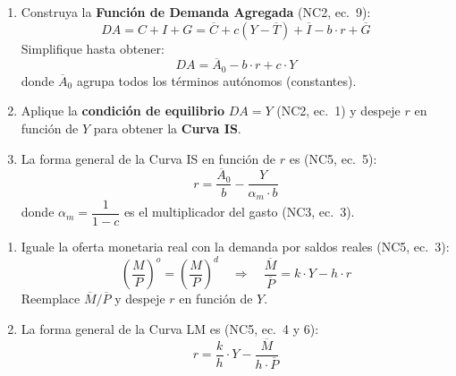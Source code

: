 \documentclass[11pt,a4paper]{article}
\newcommand{\barvar}[1]{\overline{#1}}
\begin{document}
\begin{hintbox}
\begin{enumerate}[leftmargin=1.5em, itemsep=4pt]
    \item Construya la \textbf{Funci\'{o}n de Demanda Agregada} (NC2, ec.\ 9):
    \[
        DA = C + I + G = \barvar{C} + c(Y - \barvar{T}) + \barvar{I} - b \cdot r + \barvar{G}
    \]
    Simplifique hasta obtener:
    \[
        DA = \barvar{A}_0 - b \cdot r + c \cdot Y
    \]
    donde $\barvar{A}_0$ agrupa todos los t\'{e}rminos aut\'{o}nomos (constantes).

    \item Aplique la \textbf{condici\'{o}n de equilibrio} $DA = Y$ (NC2, ec.\ 1) y despeje $r$ en funci\'{o}n de $Y$ para obtener la \textbf{Curva IS}.

    \item La forma general de la Curva IS en funci\'{o}n de $r$ es (NC5, ec.\ 5):
    \begin{equation*}
    \boxed{\; r = \frac{\barvar{A}_0}{b} - \frac{Y}{\alpha_m \cdot b} \;}
    \end{equation*}
    donde $\alpha_m = \dfrac{1}{1 - c}$ es el multiplicador del gasto (NC3, ec.\ 3).
\end{enumerate}
\end{hintbox}

\vspace{0.4cm}

\begin{hintbox}
\begin{enumerate}[leftmargin=1.5em, itemsep=4pt]
    \item Iguale la oferta monetaria real con la demanda por saldos reales (NC5, ec.\ 3):
    \[
        \left(\frac{M}{P}\right)^o = \left(\frac{M}{P}\right)^d \quad \Longrightarrow \quad \frac{\barvar{M}}{\barvar{P}} = k \cdot Y - h \cdot r
    \]
    Reemplace $\barvar{M}/\barvar{P}$ y despeje $r$ en funci\'{o}n de $Y$.

    \item La forma general de la Curva LM es (NC5, ec.\ 4 y 6):
    \begin{equation*}
    \boxed{\; r = \frac{k}{h} \cdot Y - \frac{\barvar{M}}{h \cdot \barvar{P}} \;}
    \end{equation*}
\end{enumerate}
\end{hintbox}

\vspace{0.4cm}
\end{document}
